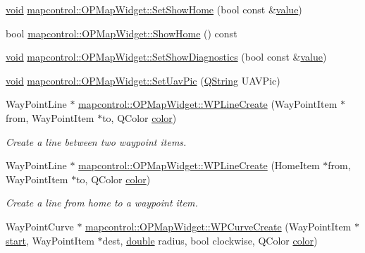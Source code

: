 \begin{DoxyCompactItemize}
\item 
\hyperlink{group___u_a_v_objects_plugin_ga444cf2ff3f0ecbe028adce838d373f5c}{void} \hyperlink{group___o_p_map_widget_gaa503c30b06667b16caa4190f8fa47f86}{mapcontrol\-::\-O\-P\-Map\-Widget\-::\-Set\-Show\-Home} (bool const \&\hyperlink{glext_8h_aa0e2e9cea7f208d28acda0480144beb0}{value})
\item 
bool \hyperlink{group___o_p_map_widget_ga0479c8181e84aade1b9a3eac69daf0b6}{mapcontrol\-::\-O\-P\-Map\-Widget\-::\-Show\-Home} () const 
\item 
\hyperlink{group___u_a_v_objects_plugin_ga444cf2ff3f0ecbe028adce838d373f5c}{void} \hyperlink{group___o_p_map_widget_gabf19ca6f76133841be5fedfff841073e}{mapcontrol\-::\-O\-P\-Map\-Widget\-::\-Set\-Show\-Diagnostics} (bool const \&\hyperlink{glext_8h_aa0e2e9cea7f208d28acda0480144beb0}{value})
\item 
\hyperlink{group___u_a_v_objects_plugin_ga444cf2ff3f0ecbe028adce838d373f5c}{void} \hyperlink{group___o_p_map_widget_ga6413251a1bea12088cdfa6d7f599ba04}{mapcontrol\-::\-O\-P\-Map\-Widget\-::\-Set\-Uav\-Pic} (\hyperlink{group___u_a_v_objects_plugin_gab9d252f49c333c94a72f97ce3105a32d}{Q\-String} U\-A\-V\-Pic)
\item 
Way\-Point\-Line $\ast$ \hyperlink{group___o_p_map_widget_gaf6d0234b2aa0e66f40f4da7bc3b9fb4f}{mapcontrol\-::\-O\-P\-Map\-Widget\-::\-W\-P\-Line\-Create} (Way\-Point\-Item $\ast$from, Way\-Point\-Item $\ast$to, Q\-Color \hyperlink{glext_8h_a3ea846f998d64f079b86052b6c4193a8}{color})
\begin{DoxyCompactList}\small\item\em Create a line between two waypoint items. \end{DoxyCompactList}\item 
Way\-Point\-Line $\ast$ \hyperlink{group___o_p_map_widget_gada64bfaa4e838335d8b923e9e184b373}{mapcontrol\-::\-O\-P\-Map\-Widget\-::\-W\-P\-Line\-Create} (Home\-Item $\ast$from, Way\-Point\-Item $\ast$to, Q\-Color \hyperlink{glext_8h_a3ea846f998d64f079b86052b6c4193a8}{color})
\begin{DoxyCompactList}\small\item\em Create a line from home to a waypoint item. \end{DoxyCompactList}\item 
Way\-Point\-Curve $\ast$ \hyperlink{group___o_p_map_widget_ga18e61fa069c17e42dd0d6743e1e24ce4}{mapcontrol\-::\-O\-P\-Map\-Widget\-::\-W\-P\-Curve\-Create} (Way\-Point\-Item $\ast$\hyperlink{glext_8h_a13be19455586e95d5a42ed8f054afad2}{start}, Way\-Point\-Item $\ast$dest, \hyperlink{_super_l_u_support_8h_a8956b2b9f49bf918deed98379d159ca7}{double} radius, bool clockwise, Q\-Color \hyperlink{glext_8h_a3ea846f998d64f079b86052b6c4193a8}{color})

\end{DoxyCompactItemize}
